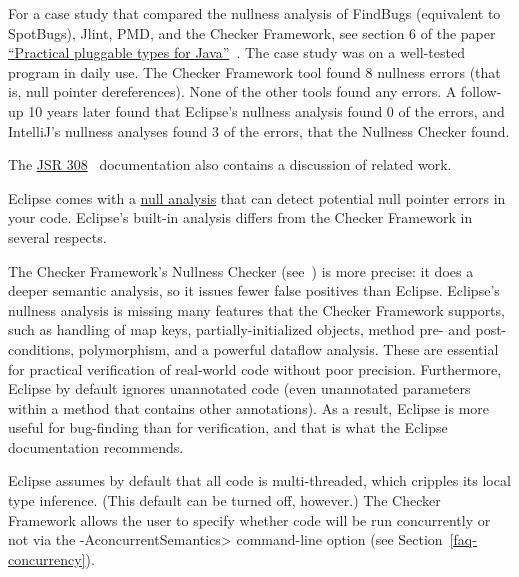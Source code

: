 For a case study that compared the nullness analysis of FindBugs
(equivalent to SpotBugs), Jlint,
PMD, and the Checker Framework, see section 6 of the paper
\href{https://homes.cs.washington.edu/~mernst/pubs/pluggable-checkers-issta2008.pdf}{``Practical pluggable types for Java''}~\cite{PapiACPE2008}.
The case study was on a well-tested program in daily use.  The Checker
Framework tool found 8 nullness errors (that is, null pointer
dereferences).  None of the other tools found any errors.  A follow-up 10
years later found that Eclipse's nullness analysis found 0 of the errors,
and  IntelliJ's nullness analyses found 3 of the errors, that the Nullness
Checker found.

The
\href{https://checkerframework.org/jsr308/}{JSR 308}~\cite{JSR308-2008-09-12}
documentation also contains a discussion of related work.



Eclipse comes with a
\href{https://help.eclipse.org/luna/index.jsp?topic=\%2Forg.eclipse.jdt.doc.user\%2Ftasks\%2Ftask-using_null_annotations.htm}{null analysis} that
can detect potential null pointer errors in your code.  Eclipse's built-in
analysis differs from the Checker Framework in several respects.

The Checker Framework's Nullness Checker
(see~) is more precise:  it does a deeper
semantic analysis, so it issues fewer false positives than Eclipse.
Eclipse's nullness analysis is missing many features that the Checker
Framework supports, such as handling of map keys, partially-initialized
objects, method pre- and post-conditions, polymorphism, and a powerful
dataflow analysis.  These are essential for practical verification of
real-world code without poor precision.
Furthermore, Eclipse by default ignores unannotated code (even unannotated
parameters within a method that contains other annotations).
As a result, Eclipse is more useful for bug-finding than for verification,
and that is what the Eclipse documentation recommends.

Eclipse assumes by default that all code is multi-threaded, which cripples its local
type inference.  (This default can be turned off, however.)
The Checker Framework allows the user to
specify whether code will be run concurrently or not via the
\<-AconcurrentSemantics> command-line option (see
Section~\ref{faq-concurrency}).

